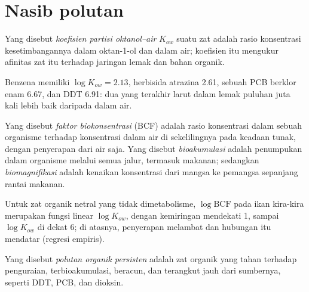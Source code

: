 \section{Nasib polutan}

\begin{definition}\label{def:b3:environmental-toxicology:kow}
Yang disebut \emph{koefisien partisi oktanol--air}
$K_{ow}$ suatu zat adalah rasio konsentrasi kesetimbangannya dalam
oktan-1-ol dan dalam air; koefisien itu mengukur afinitas zat itu terhadap jaringan lemak dan bahan
organik.
\end{definition}

Benzena memiliki $\log K_{ow} = 2.13$, herbisida atrazina 2.61, sebuah PCB berklor enam 6.67, dan
DDT 6.91: dua yang terakhir larut dalam lemak puluhan juta kali lebih baik daripada dalam
air.

\begin{definition}[Bioakumulasi]\label{def:b3:environmental-toxicology:bio}
Yang disebut \emph{faktor biokonsentrasi} (BCF) adalah
rasio konsentrasi dalam sebuah organisme terhadap konsentrasi dalam air di sekelilingnya pada
keadaan tunak, dengan penyerapan dari air saja. Yang disebut \emph{bioakumulasi}
adalah penumpukan dalam organisme melalui semua jalur, termasuk makanan; sedangkan
\emph{biomagnifikasi} adalah kenaikan
konsentrasi dari mangsa ke pemangsa sepanjang rantai makanan.
\end{definition}

\begin{proposition}\label{prop:b3:environmental-toxicology:bcf-kow}
Untuk zat organik netral yang tidak dimetabolisme, $\log\mathrm{BCF}$ pada ikan
kira-kira merupakan fungsi linear $\log K_{ow}$, dengan kemiringan mendekati 1, sampai $\log K_{ow}$ di dekat 6;
di atasnya, penyerapan melambat dan hubungan itu mendatar (regresi empiris).
\admitted
\end{proposition}

\begin{definition}\label{def:b3:environmental-toxicology:pop}
Yang disebut \emph{polutan organik persisten} adalah
zat organik yang tahan terhadap penguraian, terbioakumulasi, beracun, dan
terangkut jauh dari sumbernya, seperti DDT, PCB, dan dioksin.
\end{definition}

